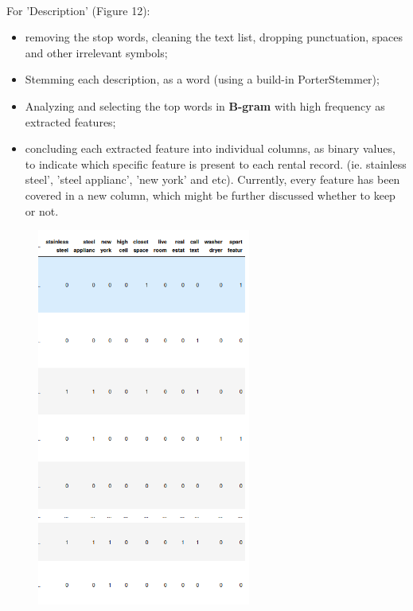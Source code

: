 \documentclass[10pt,twocolumn,letterpaper]{article}
\begin{document}
\\ For 'Description' (Figure 12):
\begin{itemize}
  \item removing the stop words, cleaning the text list, dropping punctuation, spaces and other irrelevant symbols;
  \item Stemming each description, as a word (using a build-in PorterStemmer);
  \item Analyzing and selecting the top words in {\bf B-gram} with high frequency as extracted features;
  \item concluding each extracted feature into individual columns, as binary values, to indicate which specific feature is present to each rental record. (ie. stainless steel', 'steel applianc', 'new york' and etc). Currently, every feature has been covered in a new column, which might be further discussed whether to keep or not.
\end{itemize}


\begin{figure}[h!]
    \centering
    \includegraphics[width=7cm]{bgram.png}
    \caption{}
    \label{fig:galaxy}
\end{figure}
\end{document}
